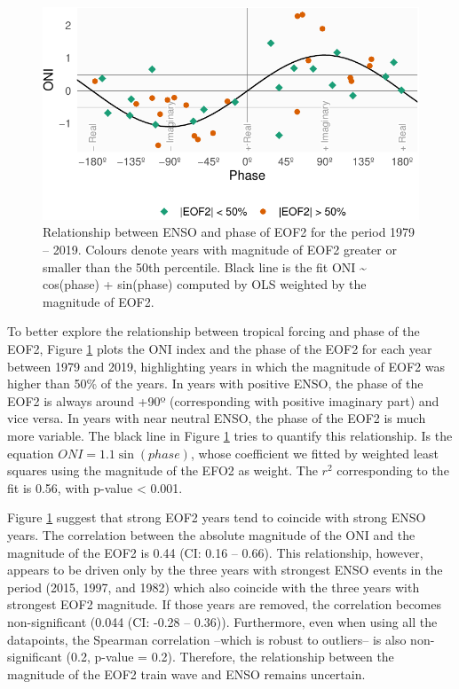 \documentclass[smallextended]{svjour3}       %
\begin{document}
\begin{figure}
\centering
\includegraphics{../figures/enso-phase-1.pdf}
\caption{\label{fig:enso-phase}Relationship between ENSO and phase of EOF2 for the period 1979 -- 2019. Colours denote years with magnitude of EOF2 greater or smaller than the 50th percentile. Black line is the fit ONI \textasciitilde{} cos(phase) + sin(phase) computed by OLS weighted by the magnitude of EOF2.}
\end{figure}

To better explore the relationship between tropical forcing and phase of the EOF2, Figure \ref{fig:enso-phase} plots the ONI index and the phase of the EOF2 for each year between 1979 and 2019, highlighting years in which the magnitude of EOF2 was higher than 50\% of the years. In years with positive ENSO, the phase of the EOF2 is always around +90º (corresponding with positive imaginary part) and vice versa. In years with near neutral ENSO, the phase of the EOF2 is much more variable. The black line in Figure \ref{fig:enso-phase} tries to quantify this relationship. Is the equation \(ONI = 1.1\sin{(phase)}\), whose coefficient we fitted by weighted least squares using the magnitude of the EFO2 as weight. The \(r^2\) corresponding to the fit is 0.56, with p-value \textless{} 0.001.

Figure \ref{fig:enso-phase} suggest that strong EOF2 years tend to coincide with strong ENSO years. The correlation between the absolute magnitude of the ONI and the magnitude of the EOF2 is 0.44 (CI: 0.16 -- 0.66). This relationship, however, appears to be driven only by the three years with strongest ENSO events in the period (2015, 1997, and 1982) which also coincide with the three years with strongest EOF2 magnitude. If those years are removed, the correlation becomes non-significant (0.044 (CI: -0.28 -- 0.36)). Furthermore, even when using all the datapoints, the Spearman correlation --which is robust to outliers-- is also non-significant (0.2, p-value = 0.2). Therefore, the relationship between the magnitude of the EOF2 train wave and ENSO remains uncertain.
\end{document}
